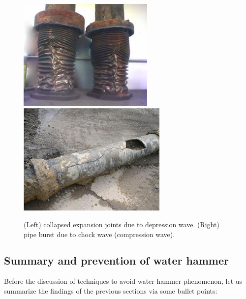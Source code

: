 \begin{figure}[ht]
\centering
\includegraphics[height=5.5cm]{figs/Water-hammer-blown-expansion-joints.jpg}
\includegraphics[height=5.5cm]{figs/water_hammer2.jpg}
\caption{\label{fig:WaterHammerExamples} (Left) collapsed expansion joints due to depression wave. (Right) pipe burst due to chock wave (compression wave).}
\end{figure}

\subsection{Summary and prevention of water hammer}

Before the discussion of techniques to avoid water hammer phenomenon, let us summarize the findings of the previous sections via some bullet points:

